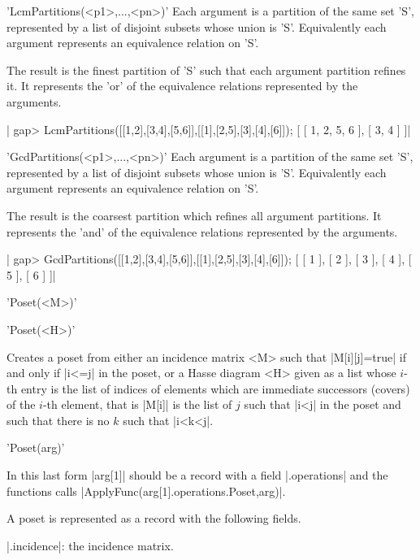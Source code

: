 %

'LcmPartitions(<p1>,...,<pn>)'
Each  argument is a partition of the same set 'S', represented by a list of
disjoint  subsets whose union is 'S'. Equivalently each argument represents
an equivalence relation on 'S'.

The result is the finest partition of 'S' such that each argument partition
refines it. It represents the 'or' of the equivalence relations represented
by the arguments.

|    gap> LcmPartitions([[1,2],[3,4],[5,6]],[[1],[2,5],[3],[4],[6]]);
    [ [ 1, 2, 5, 6 ], [ 3, 4 ] ]|

%

'GcdPartitions(<p1>,...,<pn>)'
Each  argument is a partition of the same set 'S', represented by a list of
disjoint  subsets whose union is 'S'. Equivalently each argument represents
an equivalence relation on 'S'.

The result is the coarsest partition which refines all argument partitions.
It  represents the  'and' of  the equivalence  relations represented by the
arguments.

|    gap> GcdPartitions([[1,2],[3,4],[5,6]],[[1],[2,5],[3],[4],[6]]);
    [ [ 1 ], [ 2 ], [ 3 ], [ 4 ], [ 5 ], [ 6 ] ]|

%

'Poset(<M>)'

'Poset(<H>)'

Creates   a  poset   from  either   an  incidence   matrix  <M>  such  that
|M[i][j]=true|  if and only if |i<=j| in  the poset, or a Hasse diagram <H>
given as a list whose $i$-th entry is the list of indices of elements which
are  immediate successors (covers) of the $i$-th element, that is |M[i]| is
the  list of $j$ such that |i<j| in the poset and such that there is no $k$
such that |i<k<j|.

'Poset(arg)'

In  this last form |arg[1]|  should be a record  with a field |.operations|
and the functions calls |ApplyFunc(arg[1].operations.Poset,arg)|.

A poset is represented as a record with the following fields.

  |.incidence|:  the incidence matrix.


